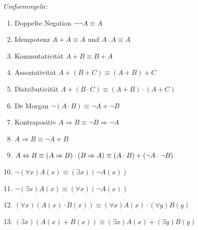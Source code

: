\documentclass[german,color,6pt]{latex4ei/latex4ei_sheet}
\begin{document}
\begin{emphbox}
\emph{Umformregeln:}
\begin{enumerate}
	\item Doppelte Negation $\neg \neg A \equiv A$
	\item Idempotenz $ A + A \equiv A$ und $ A \cdot A \equiv A$
	\item Kommutativität $A + B \equiv B + A$
	\item Assoziativität $A + (B + C) \equiv (A + B) + C$
	\item Distributivität $A + (B \cdot C) \equiv (A + B) \cdot (A + C)$
	\item De Morgan $\neg(A \cdot B) \equiv \neg A + \neg B$
	\item Kontrapositiv $A \Rightarrow B \equiv \neg B \Rightarrow \neg A$ 
	\item $ A \Rightarrow B \equiv \neg A + B$ 
	\item $ A \Leftrightarrow B \equiv (A \Rightarrow B ) \cdot (B \Rightarrow A) \equiv (A \cdot B) + (\neg A \cdot \neg B) $
	\item $ \neg (\forall x)A(x) \equiv (\exists x)(\neg A(x))$ 
	\item $ \neg (\exists x) A(x) \equiv (\forall x) (\neg{}A(x)) $ 
	\item $ (\forall x)(A(x) \cdot B(x)) \equiv (\forall x)A(x) \cdot (\forall y )B(y)$ 
	\item $ (\exists x)(A(x) + B(x)) \equiv (\exists x)A(x) + (\exists y)B(y)$
\end{enumerate}
\end{emphbox}
\end{document}
